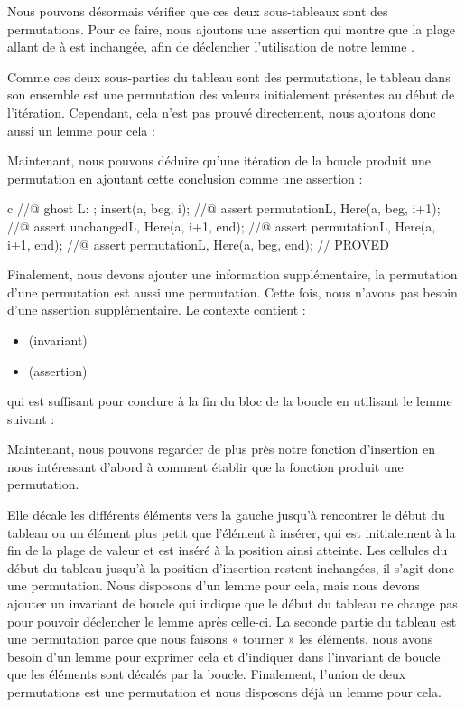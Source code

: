 Nous pouvons désormais vérifier que ces deux sous-tableaux sont des
permutations. Pour ce faire, nous ajoutons une assertion qui montre que la
plage allant de  à  est inchangée, afin de
déclencher l'utilisation de notre lemme .




Comme ces deux sous-parties du tableau sont des permutations, le tableau
dans son ensemble est une permutation des valeurs initialement présentes au début
de l'itération. Cependant, cela n'est pas prouvé directement, nous ajoutons
donc aussi un lemme pour cela :




Maintenant, nous pouvons déduire qu'une itération de la boucle produit
une permutation en ajoutant cette conclusion comme une assertion :


\begin{CodeBlock}{c}
    //@ ghost L: ;
    insert(a, beg, i);
    //@ assert permutation{L, Here}(a, beg, i+1);
    //@ assert unchanged{L, Here}(a, i+1, end);
    //@ assert permutation{L, Here}(a, i+1, end);
    //@ assert permutation{L, Here}(a, beg, end); // PROVED
\end{CodeBlock}


Finalement, nous devons ajouter une information supplémentaire, la permutation
d'une permutation est aussi une permutation. Cette fois, nous n'avons pas
besoin d'une assertion supplémentaire. Le contexte contient :
\begin{itemize}
\item {} (invariant)
\item {} (assertion)
\end{itemize}
qui est suffisant pour conclure 
à la fin du bloc de la boucle en utilisant le lemme suivant :




Maintenant, nous pouvons regarder de plus près notre fonction d'insertion en
nous intéressant d'abord à comment établir que la fonction produit une permutation.


Elle décale les différents éléments vers la gauche jusqu'à rencontrer le
début du tableau ou un élément plus petit que l'élément à insérer, qui est
initialement à la fin de la plage de valeur et est inséré à la position ainsi
atteinte.
Les cellules du début du tableau jusqu'à la position d'insertion restent
inchangées, il s'agit donc une permutation. Nous disposons d'un lemme pour cela,
mais nous devons ajouter un invariant de boucle qui indique que le début du
tableau ne change pas pour pouvoir déclencher le lemme après celle-ci. La
seconde partie du tableau est une permutation parce que nous faisons « tourner »
les éléments, nous avons besoin d'un lemme pour exprimer cela et d'indiquer dans
l'invariant de boucle que les éléments sont décalés par la boucle. Finalement,
l'union de deux permutations est une permutation et nous disposons déjà un lemme
pour cela.


